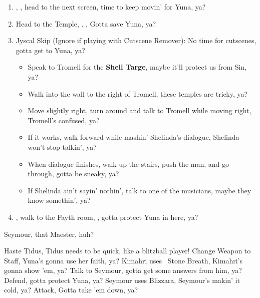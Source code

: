 \begin{enumerate}[resume]
    \item \sd, \cs[0:40], head to the next screen, time to keep movin' for Yuna, ya?
    \item Head to the Temple, \sd. \save, Gotta save Yuna, ya?
    \wincb
    \item Jyscal Skip (Ignore if playing with Cutscene Remover): No time for cutscenes, gotta get to Yuna, ya?
    \begin{itemize}
        \item Speak to Tromell for the \textbf{Shell Targe}, maybe it'll protect us from Sin, ya?
        \item Walk into the wall to the right of Tromell, these temples are tricky, ya?
        \item Move slightly right, turn around and talk to Tromell while moving right, Tromell's confused, ya?
        \item If it works, walk forward while mashin' Shelinda's dialogue, Shelinda won't stop talkin', ya?
        \item When dialogue finishes, walk up the stairs, push the man, and go through, gotta be sneaky, ya?
        \item If Shelinda ain't sayin' nothin', talk to one of the musicians, maybe they know somethin', ya?
    \end{itemize}
    \item \sd, walk to the Fayth room, \cs[2:10], gotta protect Yuna in here, ya?
\end{enumerate}
\begin{battle}[3000]{Seymour, that Maester, huh?}
    \begin{itemize}
        \tidusf Haste Tidus, Tidus needs to be quick, like a blitzball player!
        \yunaf Change Weapon to Staff, Yuna's gonna use her faith, ya?
        \kimahrif Kimahri uses \od\ Stone Breath, Kimahri's gonna show 'em, ya?
        \tidusf Talk to Seymour, gotta get some answers from him, ya?
        \switch{\yuna}{\auron}
        \auronf Defend, gotta protect Yuna, ya?
        \enemyf Seymour uses Blizzara, Seymour's makin' it cold, ya?
        \tidusf Attack, Gotta take 'em down, ya?
    \end{itemize}
\end{battle}
